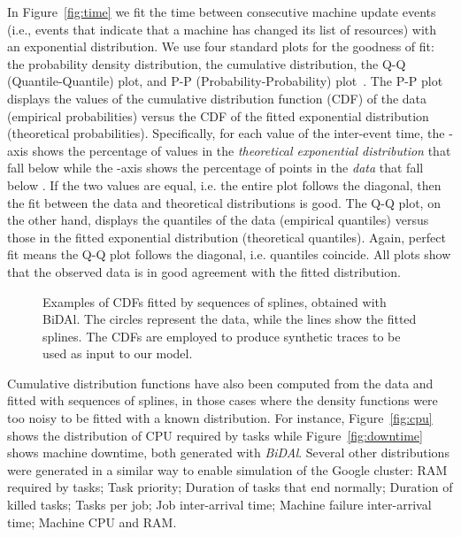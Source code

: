 \documentclass{article}
\begin{document}
In Figure~\ref{fig:time} we fit the time between consecutive machine update events (i.e., events that indicate that a machine has changed its list of resources) with an exponential distribution.  We use four standard plots for the goodness of fit: the probability density distribution, the cumulative distribution, the Q-Q (Quantile-Quantile) plot, and P-P (Probability-Probability) plot~\cite{gibbons2011}. The P-P plot displays the values of the cumulative distribution function (CDF) of the data (empirical probabilities) versus the CDF of the fitted exponential distribution (theoretical probabilities). Specifically, for each value  of the inter-event time, the -axis shows the percentage of values in the \emph{theoretical exponential distribution} that fall below  while the -axis shows the percentage of points in the \emph{data} that fall below . If the two values are equal, i.e. the entire plot follows the diagonal, then the fit between the data and theoretical distributions is good. The Q-Q plot, on the other hand, displays the quantiles of the data (empirical quantiles) versus those in the fitted exponential distribution (theoretical quantiles). Again, perfect fit means the Q-Q plot follows the diagonal, i.e. quantiles coincide. All plots show that the observed data is in good agreement with the fitted distribution. 


\begin{figure}
\centering
{}
 \qquad
\caption{Examples of CDFs fitted by sequences of splines, obtained with BiDAl. The circles represent the data, while the lines show the fitted splines. The CDFs are employed to produce synthetic traces to be used as input to our model.}      
\end{figure}

Cumulative distribution functions have also been computed from the data and fitted with sequences of splines, in those cases where the density functions were too noisy to be fitted with a known distribution. For instance, Figure~\ref{fig:cpu} shows the distribution of CPU required by tasks while Figure~\ref{fig:downtime} shows machine downtime, both generated with \emph{BiDAl}. Several other distributions were generated in a similar way to enable simulation of the Google cluster: RAM required by tasks; Task priority; Duration of tasks that end normally; Duration of killed tasks; Tasks per job; Job inter-arrival time; Machine failure inter-arrival time; Machine CPU and RAM.
\end{document}
